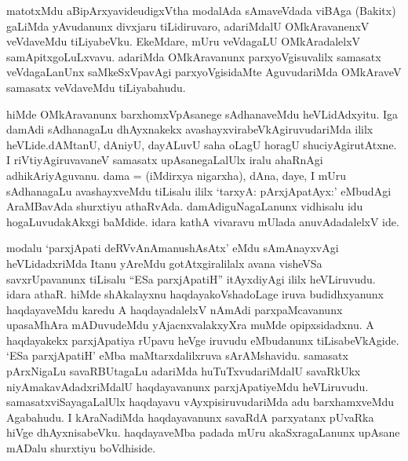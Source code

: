 \begin{artha}
matotxMdu aBipArxyavide\ndash  udigxVtha modalAda sAmaveVdada viBAga (Bakitx) gaLiMda yAvudanunx divxjaru tiLidiruvaro, adariMdalU OMkAravanenxV veVdaveMdu tiLiyabeVku. EkeMdare, mUru veVdagaLU OMkAradalelxV samApitxgoLuLxvavu. adariMda OMkAravanunx parxyoVgisuvalilx samasatx veVdagaLanUnx saMkeSxVpavAgi parxyoVgisidaMte AguvudariMda OMkAraveV samasatx veVdaveMdu tiLiyabahudu.
\end{artha}


\begin{artha}
hiMde OMkAravanunx barxhomxVpAsanege sAdhanaveMdu heVLidAdxyitu. Iga damAdi sAdhanagaLu dhAyxnakekx avashayxvirabeVkAgiruvudariMda ililx heVLide.\break dAMtanU, dAniyU, dayALuvU saha oLagU horagU shuciyAgirutAtxne. I riVtiyAgiruvavaneV samasatx upAsanegaLalUlx iralu ahaRnAgi adhikAriyAguvanu. dama = (iMdirxya nigarxha), dAna, daye, I mUru sAdhanagaLu avashayxveMdu tiLisalu ililx `tarxyA: pArxjApatAyx:' eMbudAgi AraMBavAda shurxtiyu athaRvAda. damAdiguNagaLanunx vidhisalu idu hogaLuvudakAkxgi baMdide. idara kathA vivaravu mUlada anuvAdadalelxV ide.
\end{artha}


\begin{artha}
modalu `parxjApati deRVvAnAmanushAsAtx' eMdu sAmAnayxvAgi heVLidadxriMda Itanu yAreMdu gotAtxgiralilalx avana visheVSa savxrUpavanunx tiLisalu ``ESa parxjApatiH'' itAyxdiyAgi ililx heVLiruvudu. idara athaR. hiMde shAkalayxnu haqdayakoVshadoLage iruva budidhxyanunx haqdayaveMdu karedu A haqdayadalelxV nAmAdi parxpaMcavanunx upasaMhAra mADuvudeMdu yAjacnxvalakxyXra muMde opipxsidadxnu. A haqdayakekx parxjApatiya rUpavu heVge iruvudu eMbudanunx tiLisabeVkAgide. `ESa parxjApatiH' eMba maMtarxdalilxruva sArAMshavidu. samasatx pArxNigaLu savaRBUtagaLu adariMda huTuTxvudariMdalU savaRkUkx niyAmakavAdadxriMdalU haqdayavanunx parxjApatiyeMdu heVLiruvudu. samasatxviSayagaLalUlx haqdayavu vAyxpisiruvudariMda adu barxhamxveMdu Agabahudu. I kAraNadiMda haqdayavanunx savaRdA parxyatanx pUvaRka hiVge dhAyxnisabeVku. haqdayaveMba padada mUru akaSxragaLanunx upAsane mADalu shurxtiyu boVdhiside.
\end{artha}
\newpage

